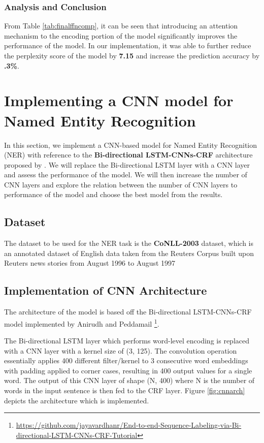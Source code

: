 \documentclass[sigconf,nonacm=true]{acmart}
\begin{document}
\subsubsection{Analysis and Conclusion}
From Table \ref{tab:finalffncomp}, it can be seen that introducing an attention mechanism to the encoding portion of the model significantly improves the performance of the model. In our implementation, it was able to further reduce the perplexity score of the model by \textbf{7.15} and increase the prediction accuracy by \textbf{.3\%}.

\section{Implementing a CNN model for Named Entity Recognition}
In this section, we implement a CNN-based model for Named Entity Recognition (NER) with reference to the \textbf{Bi-directional LSTM-CNNs-CRF} architecture proposed by \citet{ma2016endtoend}. We will replace the Bi-directional LSTM layer with a CNN layer and assess the performance of the model. We will then increase the number of CNN layers and explore the relation between the number of CNN layers to performance of the model and choose the best model from the results.

\subsection{Dataset}
The dataset to be used for the NER task is the \textbf{CoNLL-2003} dataset, which is an annotated dataset of English data taken from the Reuters Corpus built upon Reuters news stories from August 1996 to August 1997 \cite{DBLP:journals/corr/cs-CL-0306050}

\subsection{Implementation of CNN Architecture}
\label{subsection:cnnimpl}
The architecture of the model is based off the Bi-directional LSTM-CNNs-CRF model implemented by Anirudh and Peddamail \footnote[1]{\url{https://github.com/jayavardhanr/End-to-end-Sequence-Labeling-via-Bi-directional-LSTM-CNNs-CRF-Tutorial}}.

The Bi-directional LSTM layer which performs word-level encoding is replaced with a CNN layer with a kernel size of (3, 125). The convolution operation essentially applies 400 different filter/kernel to 3 consecutive word embeddings with padding applied to corner cases, resulting in 400 output values for a single word. The output of this CNN layer of shape (N, 400) where N is the number of words in the input sentence is then fed to the CRF layer. Figure \ref{fig:cnnarch} depicts the architecture which is implemented. 
\end{document}
